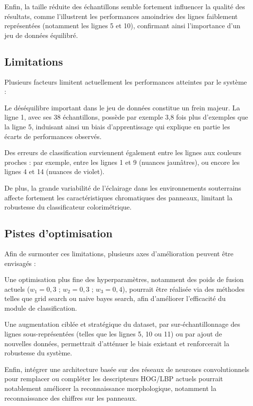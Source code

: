 \documentclass[journal]{IEEEtran}
\begin{document}
Enfin, la taille réduite des échantillons semble fortement influencer la qualité des résultats, comme l'illustrent les performances amoindries des lignes faiblement représentées (notamment les lignes 5 et 10), confirmant ainsi l'importance d'un jeu de données équilibré.

\subsection{Limitations}

Plusieurs facteurs limitent actuellement les performances atteintes par le système :

Le déséquilibre important dans le jeu de données constitue un frein majeur. La ligne 1, avec ses 38 échantillons, possède par exemple 3,8 fois plus d'exemples que la ligne 5, induisant ainsi un biais d'apprentissage qui explique en partie les écarts de performances observés.

Des erreurs de classification surviennent également entre les lignes aux couleurs proches : par exemple, entre les lignes 1 et 9 (nuances jaunâtres), ou encore les lignes 4 et 14 (nuances de violet).

De plus, la grande variabilité de l'éclairage dans les environnements souterrains affecte fortement les caractéristiques chromatiques des panneaux, limitant la robustesse du classificateur colorimétrique.

\subsection{Pistes d'optimisation}

Afin de surmonter ces limitations, plusieurs axes d'amélioration peuvent être envisagés :

Une optimisation plus fine des hyperparamètres, notamment des poids de fusion actuels ($w_1=0,3$ ; $w_2=0,3$ ; $w_3=0,4$), pourrait être réalisée via des méthodes telles que grid search ou naive bayes search, afin d'améliorer l'efficacité du module de classification.

Une augmentation ciblée et stratégique du dataset, par sur-échantillonnage des lignes sous-représentées (telles que les lignes 5, 10 ou 11) ou par ajout de nouvelles données, permettrait d'atténuer le biais existant et renforcerait la robustesse du système.

Enfin, intégrer une architecture basée sur des réseaux de neurones convolutionnels pour remplacer ou compléter les descripteurs HOG/LBP actuels pourrait notablement améliorer la reconnaissance morphologique, notamment la reconnaissance des chiffres sur les panneaux.
\end{document}
